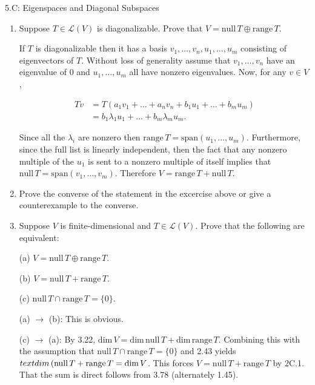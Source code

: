 \documentclass{book}
\begin{document}
5.C: Eigenspaces and Diagonal Subspaces

\begin{enumerate}

\item Suppose \(T \in \mathcal{L}(V)\) is diagonalizable.  Prove that \(V=\textrm{null} \, T \oplus \textrm{range} \, T\).

If \(T\) is diagonalizable then it has a basis \(v_1,\dots,v_n,u_1,\dots,u_m\) consisting of eigenvectors of \(T\).  Without loss of generality assume that \(v_1,\dots,v_n\) have an eigenvalue of \(0\) and \(u_1,\dots,u_m\) all have nonzero eigenvalues.  Now, for any \(v \in V\),

\begin{equation*}
    \begin{split}
        Tv &= T(a_1v_1+\dots+a_nv_n+b_1u_1+\dots+b_mu_m) \\
        &= b_1\lambda_1 u_1 + \dots + b_m\lambda_m u_m.
    \end{split}
\end{equation*}

Since all the \(\lambda_i\) are nonzero then \(\text{range} \, T = \text{span}(u_1,\dots,u_m)\).  Furthermore, since the full list is linearly independent, then the fact that any nonzero multiple of the \(u_1\) is sent to a nonzero multiple of itself implies that \(\text{null} \, T = \text{span}(v_1,\dots,v_m)\).  Therefore \(V=\text{range} \, T + \text{null} \, T\).

\item Prove the converse of the statement in the excercise above or give a counterexample to the converse.

\item Suppose \(V\) is finite-dimensional and \(T \in \mathcal{L}(V)\).  Prove that the following are equivalent:

(a) \(V = \textrm{null} \, T \oplus \textrm{range} \, T\).

(b) \(V = \textrm{null} \, T + \textrm{range} \, T\).

(c) \(\textrm{null} \, T \cap \textrm{range} \, T = \{0\}\).

(a) \(\rightarrow\) (b): This is obvious.

(c) \(\rightarrow\) (a): By 3.22, \(\text{dim} \, V = \text{dim} \, \text{null} \, T + \text{dim} \, \text{range} \, T\).  Combining this with the assumption that \(\textrm{null} \, T \cap \textrm{range} \, T = \{0\}\) and 2.43 yields \(\\text{dim} \, (\text{null} \, T + \text{range} \, T = \text{dim} \, V\).  This forces \(V = \text{null} \, T + \text{range} \, T\) by 2C.1.  That the sum is direct follows from 3.78 (alternately 1.45).


\end{enumerate}
\end{document}
